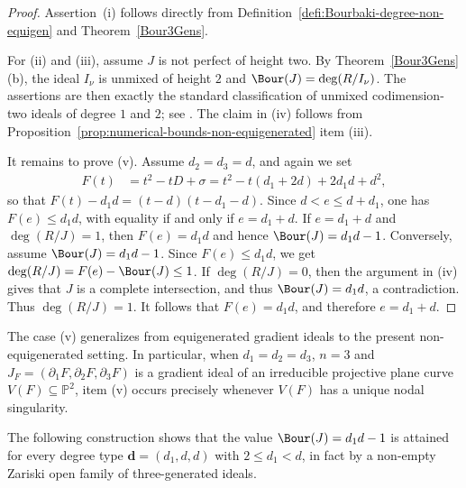 \documentclass[11pt]{amsart} %
\theoremstyle{definition}
\def\NZQ{\mathbb}               %
\def\PP{{\NZQ P}}
\begin{document}
\begin{proof}
Assertion~{\rm(i)} follows directly from
Definition~\ref{defi:Bourbaki-degree-non-equigen} and
Theorem~\ref{Bour3Gens}. 

For (ii) and (iii), assume $J$ is not perfect of height two. By Theorem~\ref{Bour3Gens}{\rm(b)}, the ideal $I_\nu$ is unmixed of height $2$ and $\Bour(J)=\deg(R/I_\nu)$. The assertions are then exactly the standard classification of unmixed codimension-two ideals of degree $1$ and $2$; see \cite[Theorem~3.2]{MFA}. The claim in (iv) follows from Proposition~\ref{prop:numerical-bounds-non-equigenerated} item (iii).

It remains to prove (v). Assume $d_2=d_3=d$, and again we set 
\begin{align*}
F(t)&= t^2 - t D + \sigma = t^2-t(d_1+2d)+2d_1d+d^2,
\end{align*}
so that $F(t) - d_1d = (t-d)(t-d_1-d)$. Since $d < e \leq d + d_1$, one has $F(e) \leq d_1 d$, with equality if and only if $e = d_1+d$. If $e=d_1+d$ and $\deg(R/J)=1$, then $F(e)=d_1d$ and hence $\Bour(J)=d_1d-1$. Conversely, assume $\Bour(J)=d_1d-1$. Since $F(e)\le d_1d$, we get $\deg(R/J)=F(e)-\Bour(J)\le1$. If $\deg(R/J)=0$, then the argument in (iv) gives that $J$ is a complete intersection, and thus $\Bour(J)=d_1d$, a contradiction. Thus $\deg(R/J)=1$. It follows that $F(e)=d_1d$, and therefore $e=d_1+d$.
\end{proof}

The case {\rm(v)} generalizes \cite[Theorem~3.8]{MAA} from equigenerated gradient ideals to the present non-equigenerated setting. In particular, when $d_1=d_2=d_3$, $n=3$ and $J_F=(\partial_1F,\partial_2F,\partial_3F)$ is a gradient ideal of an irreducible projective plane curve $V(F) \subseteq \PP^2$, item {\rm(v)} occurs precisely whenever $V(F)$ has a unique nodal singularity. 

The following construction shows that the value $\Bour(J) = d_1 d - 1$ is attained for every degree type $\textbf{d} = (d_1, d, d)$ with $2 \leq d_1 < d$, in fact by a non-empty Zariski open family of three-generated ideals.
\end{document}
